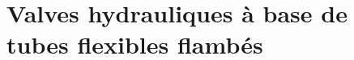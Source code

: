 

\lhead[\fancyplain{}{\leftmark}]%
      {\fancyplain{}{}} %
\chead[\fancyplain{}{}]%
      {\fancyplain{}{}}
\rhead[\fancyplain{}{}]%
      {\fancyplain{}{\rightmark}}%
\lfoot[\fancyplain{}{}]%
      {\fancyplain{}{}}
\cfoot[\fancyplain{}{\thepage}]%
      {\fancyplain{}{\thepage}} %
\rfoot[\fancyplain{}{}]%
     {\fancyplain{}{\scriptsize}}



    					 

\chapter{Valves hydrauliques à base de tubes flexibles flambés}
\label{ch:4_Valves hydrauliques a base de tubes flexibles flambes}

\minitoc
\newpage

